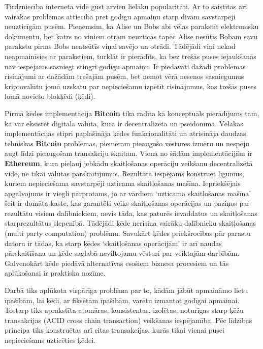 Tirdzniecība interneta vidē gūst arvien lielāku popularitāti. 
Ar to saistītas arī vairākas problēmas attiecībā pret godīgu apmaiņu starp divām savstarpēji neuzticīgām pusēm. 
Pieņemsim, ka Alise un Bobs abi vēlas parakstīt elektronisku dokumentu, bet katrs no viņiem otram neuzticās tapēc Alise nesūtīs Bobam savu parakstu pirms Bobs neatsūtīs viņai savējo un otrādi. 
Tādējādi viņi nekad neapmainīsies ar parakstiem, turklāt ir pierādīts, ka bez trešās puses iejaukšanās nav iespējams sasniegt stingri godīgu apmaiņu.\cite{pagnia99}
Ir piedāvāti dažādi problēmas risinājumi ar dažādām trešajām pusēm, bet ņemot vērā nesenos sasniegumus kriptovalūtu jomā uzskatu par nepieciešamu izpētīt risinājumus, kas trešās puses lomā novieto blokķēdi (ķēdi). 

Pirmā ķēdes implementācija \textbf{Bitcoin} tika radīta kā konceptuāls pierādījums tam, ka var eksistēt digitāla valūta, kura ir decentralizēta un pseidonīma. 
Vēlākas implementācijas stipri paplašināja ķēdes funkcionalitāti un atrisināja daudzas tehniskas \textbf{Bitcoin} problēmas, piemēram pieaugošo vēstures izmēru un nespēju augt līdzi pieaugošam transakciju skaitam. 
Viena no šādām implementācijām ir \textbf{Ethereum}, kura pieļauj jebkādu skaitļošanas operāciju veikšanu decentralizētā vidē, ne tikai valūtas pārskaitījumus. 
Rezultātā iespējams konstruēt līgumus, kuriem nepieciešama savstarpēji uzticama skaitļošanas mašīna.
Iepriekšējais apgalvojums ir viegli pārprotams, jo ar vārdiem `uzticama skaitļošanas mašīna' šeit ir domāta kaste, kas garantēti veiks skaitļošanas operācijas un paziņos par rezultātu visiem dalībniekiem, nevis tāda, kas paturēs ievaddatus un skaitļošanas starprezultātus slepenībā.
Tādējādi ķēde nerisina vairāku dalībnieku skaitļošanas (multi party computation) problēmu.
Savukārt ķēdes priekšrocības pār parastu datoru ir tādas, ka starp ķēdes `skaitļošanas operācijām' ir arī naudas pārskaitīšana un ķēde saglabā neviltojamu vēsturi par veiktajām darbībām.
Galvenokārt ķēde piedāvā alternatīvas esošiem biznesa procesiem un tās aplūkošanai ir praktiska nozīme.

Darbā tiks aplūkota vispārīga problēma par to, kādām jābūt apmaināmo lietu īpašībām, lai ķēdi, ar fiksētām īpašībām, varētu izmantot godīgai apmaiņai. Tostarp tiks aprakstīta atomāras, konsistentas, izolētas, noturīgas starp ķēžu transakcijas (ACID cross chain transaction) veikšanas iespējamība. Pēc līdzības principa tiks konstruētas arī citas transakcijas, kurās tikai vienai pusei nepieciešams uzticēties ķēdei.


